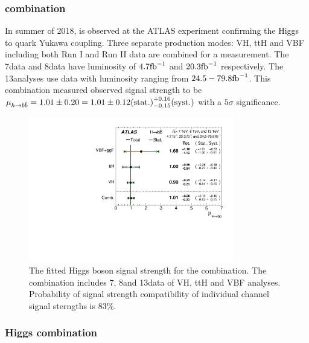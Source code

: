 \subsubsection{\Hbb combination}

In summer of 2018, \Hbb is observed at the ATLAS experiment \cite{VHPaper} confirming the Higgs to quark Yukawa coupling. Three separate \Hbb production modes: VH, ttH and VBF including both Run I and Run II data are combined for a measurement. The 7\TeV data and 8\TeV data have luminosity of $4.7\rm{fb}^{-1}$ and $20.3\rm{fb}^{-1}$ respectively. The 13\TeV analyses use data with luminosity ranging from $24.5-79.8\rm{fb}^{-1}$. This combination measured observed signal strength to be $\mu_{h \rightarrow b\bar{b}}= 1.01 \pm 0.20 = 1.01 \pm 0.12\text{(stat.)}^{+0.16}_{-0.15}\text{(syst.)}$ with a $5\sigma$ significance.


\begin{figure}[htbp]
  \centering
 \includegraphics[width=0.8\textwidth]{figures/VBF/HbbComb.pdf}
 \caption{The fitted Higgs boson signal strength for the \Hbb combination. The combination includes 7\TeV, 8\TeV and 13\TeV data of VH, ttH and VBF analyses. Probability of signal strength compatibility of individual channel signal sterngths is 83\%.}
  \label{fig:vbf-combination-hbb}
\end{figure}



\subsubsection{Higgs combination}
